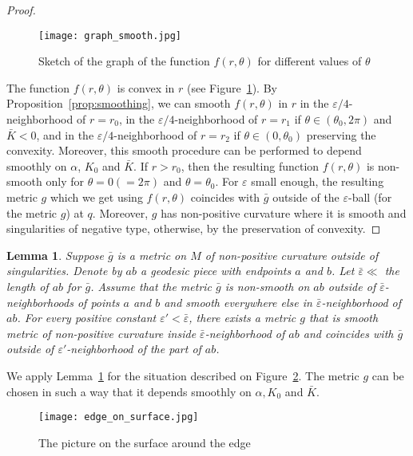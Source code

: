 \documentclass[12pt]{article}
\numberwithin{equation}{section}
\newtheorem{lem}{Lemma}[section]
\theoremstyle{definition}
\newcommand{\eps}{\varepsilon}
\begin{document}
\begin{proof}
\begin{figure}
  \centering
  \texttt{[image: graph\_smooth.jpg]}
    \caption{Sketch of the graph of the function $f(r,\theta)$ for different values of $\theta$}
    \label{fig:graph}
\end{figure}

The function $f(r,\theta)$ is convex in $r$ (see Figure~\ref{fig:graph}). By Proposition~\ref{prop:smoothing}, we can smooth $f(r, \theta)$ in $r$ in the $\eps/4$-neighborhood of $r=r_0$, in the $\eps/4$-neighborhood of $r=r_1$ if $\theta\in(\theta_0,2\pi)$ and $\bar K<0$, and in the $\eps/4$-neighborhood of $r=r_2$ if $\theta\in(0, \theta_0)$ preserving the convexity. Moreover, this smooth procedure can be performed to depend smoothly on $\alpha$, $K_0$ and $\bar K$. If $r>r_0$, then the resulting function $f(r, \theta)$ is non-smooth only for $\theta=0 (=2\pi)$ and $\theta = \theta_0$. For $\eps$ small enough, the resulting metric $g$ which we get using $f(r,\theta)$ coincides with $\bar g$ outside of the $\eps$-ball (for the metric $g$) at $q$. Moreover, $g$ has non-positive curvature where it is smooth and singularities of negative type, otherwise, by the preservation of convexity.
\end{proof}

\begin{lem}\label{lem:smooth_edge}
Suppose $\bar g$ is a metric on $M$ of non-positive curvature outside of singularities. Denote by $ab$ a geodesic piece with endpoints $a$ and $b$. Let $\bar\eps \ll$ the length of $ab$ for $\bar g$. Assume that the metric $\bar g$ is non-smooth on $ab$ outside of $\bar\eps$-neighborhoods of points $a$ and $b$ and smooth everywhere else in $\bar\eps$-neighborhood of $ab$. For every positive constant $\eps'<\bar\eps$, there exists a metric $g$ that is smooth metric of non-positive curvature inside $\bar\eps$-neighborhood of $ab$ and coincides with $\bar g$ outside of $\eps'$-neighborhood of the part of $ab$. 
\end{lem}

We apply Lemma~\ref{lem:smooth_edge} for the situation described on Figure~\ref{fig:pict_surf}. The metric $g$ can be chosen in such a way that it depends smoothly on $\alpha, K_0$ and $\bar K$.

\begin{figure}
  \centering
   \texttt{[image: edge\_on\_surface.jpg]}
    \caption{The picture on the surface around the edge}
    \label{fig:pict_surf}
\end{figure}
\end{document}
